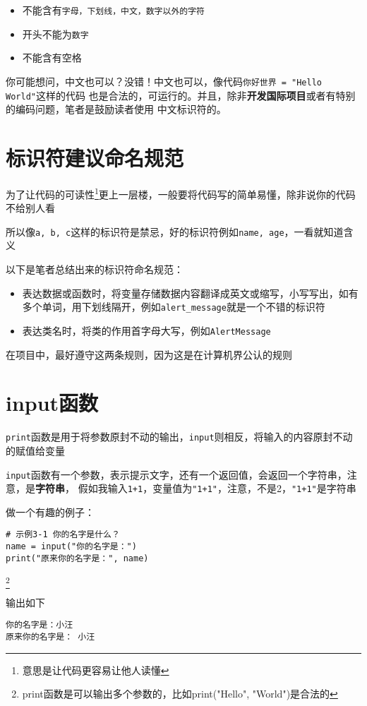 \documentclass{book}
\begin{document}
\begin{itemize}
    \item 不能含有\verb|字母，下划线，中文，数字以外的字符|
    \item 开头不能为\verb|数字|
    \item 不能含有空格
\end{itemize}

你可能想问，中文也可以？没错！中文也可以，像代码\verb|你好世界 = "Hello World"|这样的代码
也是合法的，可运行的。并且，除非\textbf{开发国际项目}或者有特别的编码问题，笔者是鼓励读者使用
中文标识符的。
\section{标识符建议命名规范}
为了让代码的可读性\footnote{意思是让代码更容易让他人读懂}更上一层楼，一般要将代码写的简单易懂，除非说你的代码不给别人看


所以像\verb|a, b, c|这样的标识符是禁忌，好的标识符例如\verb|name, age|，一看就知道含义


以下是笔者总结出来的标识符命名规范：
\begin{itemize}
    \item 表达数据或函数时，将变量存储数据内容翻译成英文或缩写，小写写出，如有多个单词，用下划线隔开，例如\verb|alert_message|就是一个不错的标识符
    \item 表达类名时，将类的作用首字母大写，例如\verb|AlertMessage|
\end{itemize}

在项目中，最好遵守这两条规则，因为这是在计算机界公认的规则
\section{input函数}
\indent \verb|print|函数是用于将参数原封不动的输出，\verb|input|则相反，将输入的内容原封不动的赋值给变量


\verb|input|函数有一个参数，表示提示文字，还有一个返回值，会返回一个字符串，注意，是\textbf{字符串}，
假如我输入\verb|1+1|，变量值为\verb|"1+1"|，注意，不是2，\verb|"1+1"|是字符串





做一个有趣的例子：
\begin{verbatim}
# 示例3-1 你的名字是什么？
name = input("你的名字是：")
print("原来你的名字是：", name)
\end{verbatim}
\footnote{print函数是可以输出多个参数的，比如print("Hello", "World")是合法的}


输出如下
\begin{verbatim}
你的名字是：小汪
原来你的名字是： 小汪
\end{verbatim}
\end{document}
